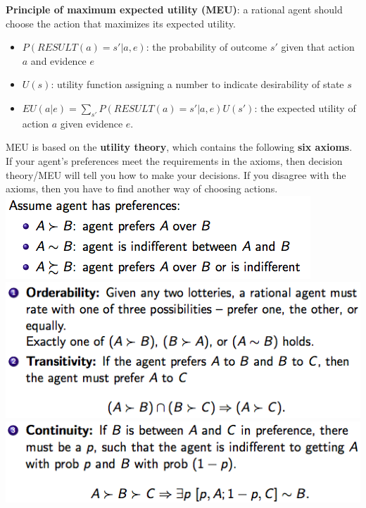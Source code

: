 \documentclass[12pt]{article}
\begin{document}
\begin{tcolorbox}
\textbf{Principle of maximum expected utility (MEU)}: a rational agent should choose the action that maximizes its expected utility. 
\begin{itemize}
\item $P(RESULT(a) = s' | a, e )$: the probability of outcome $s'$ given that action $a$ and evidence $e$
\item $U(s)$: utility function assigning a number to indicate desirability of state $s$
\item $EU(a|e) = \sum_{s'}^{} P(RESULT(a) = s' | a, e)U(s')$: the expected utility of action $a$ given evidence $e$.
\end{itemize}
\end{tcolorbox}

\begin{tcolorbox}
MEU is based on the \textbf{utility theory}, which contains the following \textbf{six axioms}. If your agent's preferences meet the requirements in the axioms, then decision theory/MEU will tell you how to make your decisions. If you disagree with the axioms, then you have to find another way of choosing actions.\\

\includegraphics[scale=0.5]{p1}\\

\includegraphics[scale=0.5]{p2}\\
\includegraphics[scale=0.5]{p3}\\


\end{tcolorbox}
\end{document}
